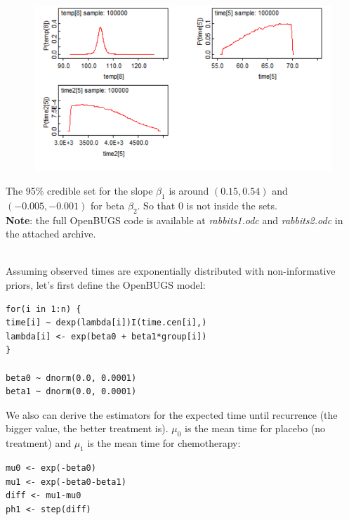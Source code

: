 \documentclass[a4 paper]{article}
\begin{document}
\begin{figure}[H]
	\includegraphics[scale=1.0]{q1_4}
	\centering
	\label{q1_4}
\end{figure}


The 95\% credible set for the slope 
$\beta_1$ is around $(0.15, 0.54)$ and
$(-0.005, -0.001)$ for beta $\beta_2$. 
So that 
$0$ is not inside the sets. \\



\textbf{Note}: the full OpenBUGS code is available 
at \textit{rabbits1.odc} and \textit{rabbits2.odc}
in the attached archive. \\ \\

 






Assuming observed times are exponentially distributed 
with non-informative priors,
let's first define the OpenBUGS model:

\begin{Verbatim}
for(i in 1:n) {                          
time[i] ~ dexp(lambda[i])I(time.cen[i],)
lambda[i] <- exp(beta0 + beta1*group[i])
}	

beta0 ~ dnorm(0.0, 0.0001)
beta1 ~ dnorm(0.0, 0.0001)
\end{Verbatim} 

We also can derive the estimators
for the expected time until recurrence (the 
bigger value, the better treatment is). 
$\mu_0$ is the mean time for placebo (no treatment)
and $\mu_1$ is the mean time for chemotherapy:

\begin{Verbatim}
mu0 <- exp(-beta0)
mu1 <- exp(-beta0-beta1)
diff <- mu1-mu0
ph1 <- step(diff)
\end{Verbatim} 
\end{document}
